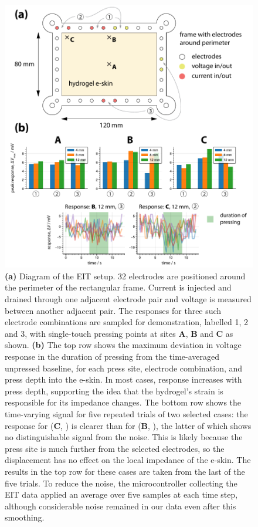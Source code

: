 \begin{figure}[htbp]
  \centering
  \includegraphics[width=0.9\columnwidth]{Images/Figure_1_diagram.pdf}
  \caption{\textbf{(a)} Diagram of the EIT setup. 32 electrodes are positioned around the perimeter of the rectangular frame. Current is injected and drained through one adjacent electrode pair and voltage is measured between another adjacent pair. The responses for three such electrode combinations are sampled for demonstration, labelled {\textcircled{\raisebox{-.9pt} {1}}}, {\textcircled{\raisebox{-.9pt} {2}}} and {\textcircled{\raisebox{-.9pt} {3}}}, with single-touch pressing points at sites \textbf{A}, \textbf{B} and \textbf{C} as shown. \textbf{(b)} The top row shows the maximum deviation in voltage response in the duration of pressing from the time-averaged unpressed baseline, for each press site, electrode combination, and press depth into the e-skin. In most cases, response increases with press depth, supporting the idea that the hydrogel's strain is responsible for its impedance changes. The bottom row shows the time-varying signal for five repeated trials of two selected cases: the response for (\textbf{C}, ) is clearer than for (\textbf{B}, ), the latter of which shows no distinguishable signal from the noise. This is likely because the press site is much further from the selected electrodes, so the displacement has no effect on the local impedance of the e-skin. The results in the top row for these cases are taken from the last of the five trials. To reduce the noise, the microcontroller collecting the EIT data applied an average over five samples at each time step, although considerable noise remained in our data even after this smoothing.}
  \label{fig:intro}
\end{figure}

